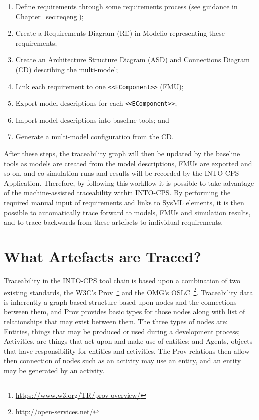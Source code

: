 \begin{enumerate}[noitemsep]
  \item Define requirements through some requirements process (see guidance in Chapter~\ref{sec:reqeng});
  \item Create a Requirements Diagram (RD) in Modelio representing these requirements;
  \item Create an Architecture Structure Diagram (ASD) and Connections Diagram (CD) describing the multi-model;
  \item Link each requirement to one \texttt{<<EComponent>>} (FMU);
  \item Export model descriptions for each \texttt{<<EComponent>>};
  \item Import model descriptions into baseline tools; and
  \item Generate a multi-model configuration from the CD.
\end{enumerate}

After these steps, the traceability graph will then be updated by the baseline tools as models are created from the model descriptions, FMUs are exported and so on, and co-simulation runs and results will be recorded by the INTO-CPS Application. Therefore, by following this workflow it is possible to take advantage of the machine-assisted traceability within INTO-CPS. By performing the required manual input of requirements and links to SysML elements, it is then possible to automatically trace forward to models, FMUs and simulation results, and to trace backwards from these artefacts to individual requirements.

\section{What Artefacts are Traced?}



Traceability in the INTO-CPS tool chain is based upon a combination of two existing standards, the W3C's Prov~\footnote{\url{https://www.w3.org/TR/prov-overview/}} and the OMG's OSLC~\footnote{\url{http://open-services.net/}}.  Traceability data is inherently a graph based structure based upon nodes and the connections between them, and Prov provides basic types for those nodes along with list of relationships that may exist between them.  The three types of nodes are: Entities, things that may be produced or used during a development process; Activities, are things that act upon and make use of entities; and Agents, objects that have responsibility for entities and activities.  The Prov relations then allow then connection of nodes such as an activity may use an entity, and an entity may be generated by an activity.    

